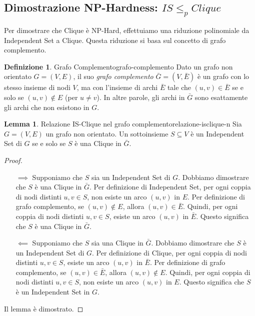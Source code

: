 \documentclass[a4paper]{article}
\theoremstyle{definition} %
\newtheorem{definition}{Definizione}[section]
\newtheorem{lemma}{Lemma}[section]
\theoremstyle{definition} %
\begin{document}
\subsection{Dimostrazione NP-Hardness: $IS \le_p Clique$}

Per dimostrare che Clique è NP-Hard, effettuiamo una riduzione polinomiale da Independent Set a Clique. Questa riduzione si basa sul concetto di grafo complemento.

\begin{definition}{Grafo Complemento}{grafo-complemento}
Dato un grafo non orientato $G=(V, E)$, il suo \emph{grafo complemento} $\bar{G}=(V, \bar{E})$ è un grafo con lo stesso insieme di nodi $V$, ma con l'insieme di archi $\bar{E}$ tale che $(u, v) \in \bar{E}$ se e solo se $(u, v) \notin E$ (per $u \ne v$). In altre parole, gli archi in $\bar{G}$ sono esattamente gli archi che non esistono in $G$.
\end{definition}

\begin{lemma}{Relazione IS-Clique nel grafo complemento}{relazione-isclique-n}
Sia $G=(V, E)$ un grafo non orientato. Un sottoinsieme $S \subseteq V$ è un Independent Set di $G$ se e solo se $S$ è una Clique in $\bar{G}$.
\end{lemma}

\begin{proof}
\begin{itemize}
    \item[$\implies$] Supponiamo che $S$ sia un Independent Set di $G$.
    Dobbiamo dimostrare che $S$ è una Clique in $\bar{G}$.
    Per definizione di Independent Set, per ogni coppia di nodi distinti $u, v \in S$, non esiste un arco $(u, v)$ in $E$.
    Per definizione di grafo complemento, se $(u, v) \notin E$, allora $(u, v) \in \bar{E}$.
    Quindi, per ogni coppia di nodi distinti $u, v \in S$, esiste un arco $(u, v)$ in $\bar{E}$. Questo significa che $S$ è una Clique in $\bar{G}$.

    \item[$\impliedby$] Supponiamo che $S$ sia una Clique in $\bar{G}$.
    Dobbiamo dimostrare che $S$ è un Independent Set di $G$.
    Per definizione di Clique, per ogni coppia di nodi distinti $u, v \in S$, esiste un arco $(u, v)$ in $\bar{E}$.
    Per definizione di grafo complemento, se $(u, v) \in \bar{E}$, allora $(u, v) \notin E$.
    Quindi, per ogni coppia di nodi distinti $u, v \in S$, non esiste un arco $(u, v)$ in $E$. Questo significa che $S$ è un Independent Set in $G$.
\end{itemize}
Il lemma è dimostrato.
\end{proof}
\end{document}
